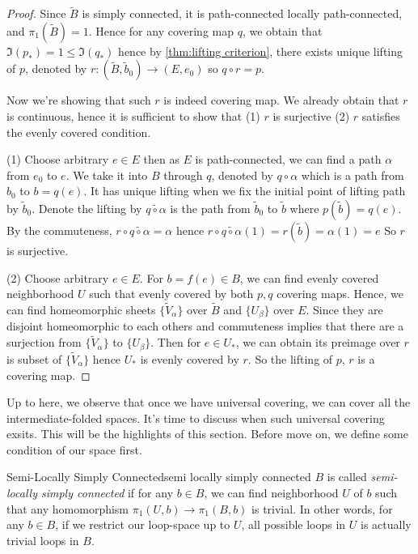 \documentclass[12pt, a4paper, twoside]{article}
\theoremstyle{plain}
\begin{document}
\begin{proof}
    Since $\tilde{B}$ is simply connected, it is path-connected locally path-connected, and $\pi_1(\tilde{B}) = 1$. 
    Hence for any covering map $q$, we obtain that $\Im(p_*) = 1 \leq \Im(q_*)$ hence by \ref{thm:lifting criterion}, 
    there exists unique lifting of $p$, denoted by $r: (\tilde{B}, \tilde{b}_0) \rightarrow (E, e_0)$ so $q \circ r = p$. 

    Now we're showing that such $r$ is indeed covering map. We already obtain that $r$ is continuous, 
    hence it is sufficient to show that (1) $r$ is surjective (2) $r$ satisfies the evenly covered condition. 

    (1) Choose arbitrary $e \in E$ then as $E$ is path-connected, we can find a path $\alpha$ from $e_0$ to $e$. 
    We take it into $B$ through $q$, denoted by $q \circ \alpha$ which is a path from $b_0$ to $b = q(e)$. 
    It has unique lifting when we fix the initial point of lifting path by $\tilde{b}_0$. 
    Denote the lifting by $\widetilde{q \circ \alpha}$ is the path from $\tilde{b}_0$ to $\tilde{b}$ where $p(\tilde{b}) = q(e)$. 
    By the commuteness, $r \circ \widetilde{q \circ \alpha} = \alpha$ hence $r \circ \widetilde{q \circ \alpha}(1) = r(\tilde{b}) = \alpha(1) = e$
    So $r$ is surjective. 

    (2) Choose arbitrary $e \in E$. For $b = f(e) \in B$, we can find evenly covered neighborhood $U$ such that 
    evenly covered by both $p, q$ covering maps. 
    Hence, we can find homeomorphic sheets $\{\tilde{V}_\alpha\}$ over $\tilde{B}$ 
    and $\{U_\beta\}$ over $E$. 
    Since they are disjoint homeomorphic to each others and commuteness implies that 
    there are a surjection from $\{\tilde{V}_\alpha\}$ to $\{U_\beta\}$. 
    Then for $e \in U_*$, we can obtain its preimage over $r$ is subset of $\{\tilde{V}_\alpha\}$ 
    hence $U_*$ is evenly covered by $r$. So the lifting of $p$, $r$ is a covering map. 
\end{proof}

\newpage

Up to here, we observe that once we have universal covering, we can cover all the intermediate-folded spaces. 
It's time to discuss when such universal covering exsits. This will be the highlights of this section. 
Before move on, we define some condition of our space first. 

\begin{defn}{Semi-Locally Simply Connected}{semi locally simply connected}
    $B$ is called \textit{semi-locally simply connected} if for any $b \in B$, 
    we can find neighborhood $U$ of $b$ such that 
    any homomorphism $\pi_1(U, b) \rightarrow \pi_1(B, b)$ is trivial. 
    In other words, for any $b \in B$, if we restrict our loop-space up to $U$, 
    all possible loops in $U$ is actually trivial loops in $B$. 
\end{defn}
\end{document}
